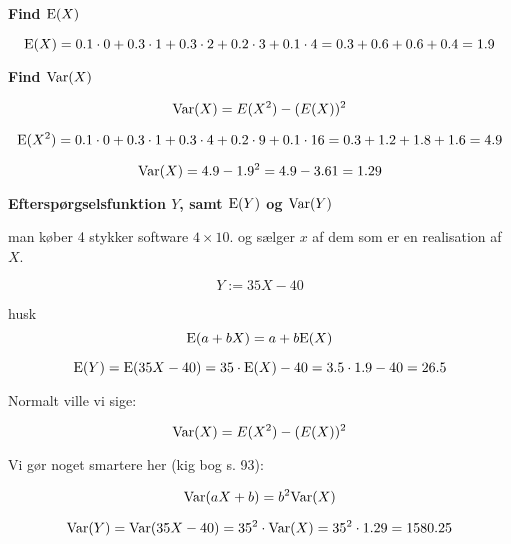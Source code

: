 \textbf{Find $\text{E}(X)$}

\begin{equation}
    \text{E}(X) = 0.1 \cdot 0 + 0.3 \cdot 1 + 0.3 \cdot 2 + 0.2 \cdot 3 + 0.1\cdot4 = 0.3 + 0.6  + 0.6 + 0.4 = 1.9
\end{equation}

\textbf{Find $\text{Var}(X)$}

\begin{equation}
    \text{Var}(X) = E(X^2) - (E(X))^2
\end{equation}

\begin{equation}
    \text{E}(X^2) = 0.1 \cdot 0 + 0.3 \cdot 1 + 0.3 \cdot 4 + 0.2 \cdot 9 + 0.1\cdot 16 = 0.3 + 1.2  + 1.8 + 1.6 = 4.9
\end{equation}

\begin{equation}
    \text{Var}(X) = 4.9 - 1.9^2 = 4.9 - 3.61 = 1.29
\end{equation}

\textbf{Efterspørgselsfunktion $Y$, samt $\text{E}(Y)$ og $\text{Var}(Y)$}

man køber 4 stykker software $4\times 10$. og sælger $x$ af dem som er en realisation af $X$.

\begin{equation}
    Y := 35X - 40
\end{equation}

husk 
\begin{equation}
    \text{E}(a + bX) = a + b \text{E}(X)
\end{equation}

\begin{equation}
    \text{E}(Y) = \text{E}(35X - 40) = 35\cdot \text{E}(X) - 40 = 3.5 \cdot 1.9 - 40 = 26.5 
\end{equation}

Normalt ville vi sige:

\begin{equation}
    \text{Var}(X) = E(X^2) - (E(X))^2
\end{equation}

Vi gør noget smartere her (kig bog s. 93):

\begin{equation}
    \text{Var}(aX + b) = b^2 \text{Var}(X)
\end{equation}

\begin{equation}
    \text{Var}(Y) = \text{Var}(35X - 40) = 35^2 \cdot \text{Var}(X) = 35^2\cdot 1.29 = 1580.25
\end{equation}

